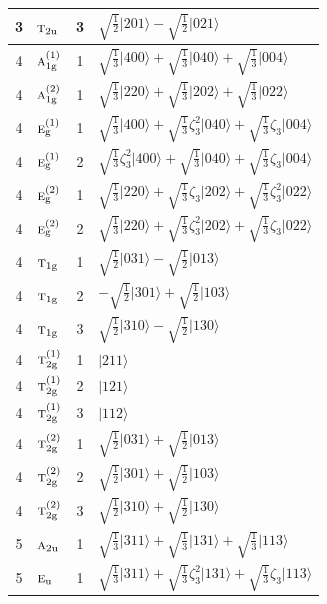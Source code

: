 \documentclass[11pt]{article}
\newcommand{\irr}[1]{\text{\normalfont\scshape #1}}
\newcommand{\ptag}[1]{\mathrm{#1}}
\newcommand{\rootunity}[1]{\zeta_{#1}}
\newcommand{\occ}[1]{\lvert #1\rangle}
\begin{document}
\begin{longtable}{c l c p{}}
3 & $\irr{t}_{2\ptag{u}}$ & 3 & $\sqrt{\tfrac{1}{2}}\occ{201}-\sqrt{\tfrac{1}{2}}\occ{021}$\\
\hline
4 & $\irr{a}_{1\ptag{g}}^{(1)}$ & 1 & $\sqrt{\tfrac{1}{3}}\occ{400}+\sqrt{\tfrac{1}{3}}\occ{040}+\sqrt{\tfrac{1}{3}}\occ{004}$\\
4 & $\irr{a}_{1\ptag{g}}^{(2)}$ & 1 & $\sqrt{\tfrac{1}{3}}\occ{220}+\sqrt{\tfrac{1}{3}}\occ{202}+\sqrt{\tfrac{1}{3}}\occ{022}$\\
4 & $\irr{e}_{\ptag{g}}^{(1)}$ & 1 & $\sqrt{\tfrac{1}{3}}\occ{400}+\sqrt{\tfrac{1}{3}}\rootunity{3}^{2}\occ{040}+\sqrt{\tfrac{1}{3}}\rootunity{3}\occ{004}$\\
4 & $\irr{e}_{\ptag{g}}^{(1)}$ & 2 & $\sqrt{\tfrac{1}{3}}\rootunity{3}^{2}\occ{400}+\sqrt{\tfrac{1}{3}}\occ{040}+\sqrt{\tfrac{1}{3}}\rootunity{3}\occ{004}$\\
4 & $\irr{e}_{\ptag{g}}^{(2)}$ & 1 & $\sqrt{\tfrac{1}{3}}\occ{220}+\sqrt{\tfrac{1}{3}}\rootunity{3}\occ{202}+\sqrt{\tfrac{1}{3}}\rootunity{3}^{2}\occ{022}$\\
4 & $\irr{e}_{\ptag{g}}^{(2)}$ & 2 & $\sqrt{\tfrac{1}{3}}\occ{220}+\sqrt{\tfrac{1}{3}}\rootunity{3}^{2}\occ{202}+\sqrt{\tfrac{1}{3}}\rootunity{3}\occ{022}$\\
4 & $\irr{t}_{1\ptag{g}}$ & 1 & $\sqrt{\tfrac{1}{2}}\occ{031}-\sqrt{\tfrac{1}{2}}\occ{013}$\\
4 & $\irr{t}_{1\ptag{g}}$ & 2 & $-\sqrt{\tfrac{1}{2}}\occ{301}+\sqrt{\tfrac{1}{2}}\occ{103}$\\
4 & $\irr{t}_{1\ptag{g}}$ & 3 & $\sqrt{\tfrac{1}{2}}\occ{310}-\sqrt{\tfrac{1}{2}}\occ{130}$\\
4 & $\irr{t}_{2\ptag{g}}^{(1)}$ & 1 & $\occ{211}$\\
4 & $\irr{t}_{2\ptag{g}}^{(1)}$ & 2 & $\occ{121}$\\
4 & $\irr{t}_{2\ptag{g}}^{(1)}$ & 3 & $\occ{112}$\\
4 & $\irr{t}_{2\ptag{g}}^{(2)}$ & 1 & $\sqrt{\tfrac{1}{2}}\occ{031}+\sqrt{\tfrac{1}{2}}\occ{013}$\\
4 & $\irr{t}_{2\ptag{g}}^{(2)}$ & 2 & $\sqrt{\tfrac{1}{2}}\occ{301}+\sqrt{\tfrac{1}{2}}\occ{103}$\\
4 & $\irr{t}_{2\ptag{g}}^{(2)}$ & 3 & $\sqrt{\tfrac{1}{2}}\occ{310}+\sqrt{\tfrac{1}{2}}\occ{130}$\\
\hline
5 & $\irr{a}_{2\ptag{u}}$ & 1 & $\sqrt{\tfrac{1}{3}}\occ{311}+\sqrt{\tfrac{1}{3}}\occ{131}+\sqrt{\tfrac{1}{3}}\occ{113}$\\
5 & $\irr{e}_{\ptag{u}}$ & 1 & $\sqrt{\tfrac{1}{3}}\occ{311}+\sqrt{\tfrac{1}{3}}\rootunity{3}^{2}\occ{131}+\sqrt{\tfrac{1}{3}}\rootunity{3}\occ{113}$\\

\end{longtable}
\end{document}
